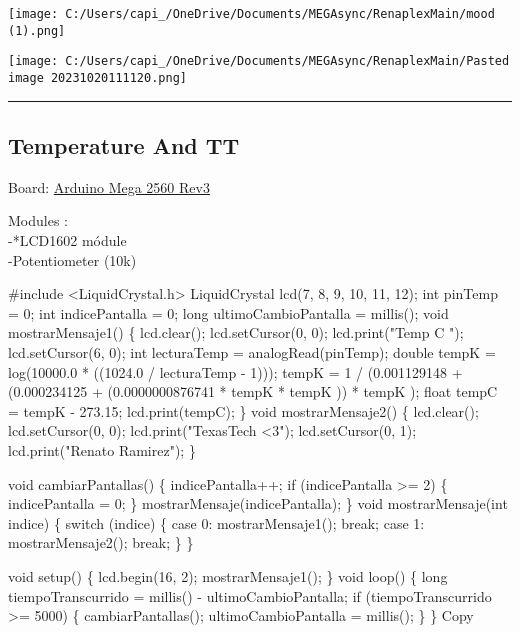\documentclass[
]{article}
\newenvironment{Shaded}{}{}
\newcommand{\NormalTok}[1]{#1}
\begin{document}
\texttt{[image: C:/Users/capi\_/OneDrive/Documents/MEGAsync/RenaplexMain/mood (1).png]}

\texttt{[image: C:/Users/capi\_/OneDrive/Documents/MEGAsync/RenaplexMain/Pasted image 20231020111120.png]}

\begin{center}\rule{0.5\linewidth}{0.5pt}\end{center}

\subsection{Temperature And TT}\label{temperature-and-tt}

Board:
\href{https://store.arduino.cc/products/arduino-mega-2560-rev3}{Arduino
Mega 2560 Rev3}

Modules :\\
-*LCD1602 módule\\
-Potentiometer (10k)

\begin{Shaded}
\begin{Highlighting}[]
\NormalTok{\#include \textless{}LiquidCrystal.h\textgreater{}}
\NormalTok{LiquidCrystal lcd(7, 8, 9, 10, 11, 12);}
\NormalTok{int pinTemp = 0;}
\NormalTok{int indicePantalla = 0;}
\NormalTok{long ultimoCambioPantalla = millis();}
\NormalTok{void mostrarMensaje1() \{}
\NormalTok{  lcd.clear();}
\NormalTok{  lcd.setCursor(0, 0);}
\NormalTok{  lcd.print("Temp         C  ");}
\NormalTok{  lcd.setCursor(6, 0);}
\NormalTok{  int lecturaTemp = analogRead(pinTemp);}
\NormalTok{  double tempK = log(10000.0 * ((1024.0 / lecturaTemp {-} 1)));}
\NormalTok{  tempK = 1 / (0.001129148 + (0.000234125 + (0.0000000876741 * tempK * tempK )) * tempK );}
\NormalTok{  float tempC = tempK {-} 273.15;}
\NormalTok{  lcd.print(tempC);}
\NormalTok{\}}
\NormalTok{void mostrarMensaje2() \{}
\NormalTok{  lcd.clear();}
\NormalTok{  lcd.setCursor(0, 0);}
\NormalTok{  lcd.print("TexasTech \textless{}3");}
\NormalTok{  lcd.setCursor(0, 1);}
\NormalTok{  lcd.print("Renato Ramirez");}
\NormalTok{\}}

\NormalTok{void cambiarPantallas() \{}
\NormalTok{  indicePantalla++;}
\NormalTok{  if (indicePantalla \textgreater{}= 2) \{}
\NormalTok{    indicePantalla = 0;}
\NormalTok{  \}}
\NormalTok{  mostrarMensaje(indicePantalla);}
\NormalTok{\}}
\NormalTok{void mostrarMensaje(int indice) \{}
\NormalTok{  switch (indice) \{}
\NormalTok{    case 0:}
\NormalTok{      mostrarMensaje1();}
\NormalTok{      break;}
\NormalTok{    case 1:}
\NormalTok{      mostrarMensaje2();}
\NormalTok{      break;}
\NormalTok{  \}}
\NormalTok{\}}

\NormalTok{void setup() \{}
\NormalTok{  lcd.begin(16, 2);}
\NormalTok{  mostrarMensaje1();}
\NormalTok{\}}
\NormalTok{void loop() \{}
\NormalTok{  long tiempoTranscurrido = millis() {-} ultimoCambioPantalla;}
\NormalTok{  if (tiempoTranscurrido \textgreater{}= 5000) \{}
\NormalTok{    cambiarPantallas();}
\NormalTok{    ultimoCambioPantalla = millis();}
\NormalTok{  \}}
\NormalTok{\}}
\NormalTok{Copy}
\end{Highlighting}
\end{Shaded}
\end{document}
